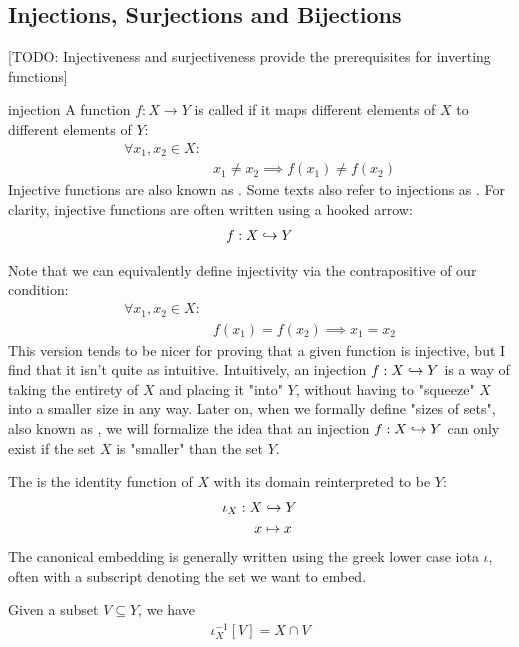 \subsection{Injections, Surjections and Bijections}
[TODO: Injectiveness and surjectiveness provide the prerequisites for inverting functions]
\begin{importantdefinition}{}{injection}
	A function $f : X \to Y$ is called  if it maps different elements of $X$ to different elements of $Y$:
	\begin{align*}
		\forall x_1, x_2 \in X:&\\
		&x_1 \neq x_2 \implies f(x_1) \neq f(x_2)
	\end{align*}
	Injective functions are also known as . Some texts also refer to injections as . For clarity, injective functions are often written using a hooked arrow:
	\begin{align*}
		f : X \hookrightarrow Y
	\end{align*}
\end{importantdefinition}
Note that we can equivalently define injectivity via the contrapositive of our condition:
\begin{align*}
	\forall x_1, x_2 \in X:&\\
	&f(x_1) = f(x_2) \implies x_1 = x_2
\end{align*}
This version tends to be nicer for proving that a given function is injective, but I find that it isn't quite as intuitive.
\newpar
Intuitively, an injection $f : X \hookrightarrow Y$ is a way of taking the entirety of $X$ and placing it "into" $Y$, without having to "squeeze" $X$ into a smaller size in any way. Later on, when we formally define "sizes of sets", also known as , we will formalize the idea that an injection $f : X \hookrightarrow Y$ can only exist if the set $X$ is "smaller" than the set $Y$.
\begin{definition}
	The 
	is the identity function of $X$ with its domain reinterpreted to be $Y$:
	\begin{align*}
		\iota_X : 
		X &\hookrightarrow Y\\
		x &\mapsto x
	\end{align*}
	The canonical embedding is generally written using the greek lower case iota $\iota$, often with a subscript denoting the set we want to embed.
\end{definition}
\begin{theorem}
	\label{th:embeddingpreimage}
	Given a subset $V \subseteq Y$, we have
	\begin{align*}
		\iota_X^{-1}[V] = X \cap V
	\end{align*}
\end{theorem}
